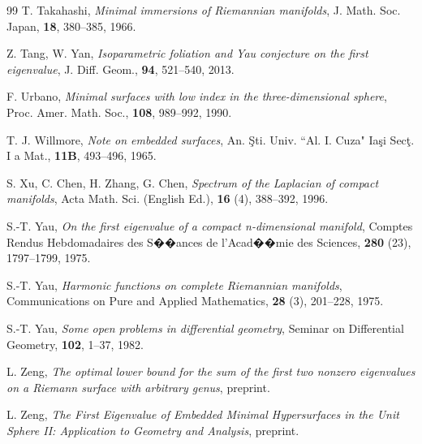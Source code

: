 \documentclass[a4, 12pt]{amsart}
\numberwithin{equation}{section} \numberwithin{equation}{section}
\begin{document}
\begin{thebibliography}{99}
T. Takahashi, \textit{Minimal immersions of Riemannian manifolds}, J. Math. Soc. Japan, {\bf 18}, 380--385, 1966.

Z. Tang, W. Yan, \textit{Isoparametric foliation and Yau conjecture on the first eigenvalue}, J. Diff. Geom., {\bf 94}, 521--540, 2013.

F. Urbano, \textit{Minimal surfaces with low index in the three-dimensional sphere}, Proc. Amer. Math. Soc., {\bf 108}, 989--992, 1990.

T. J. Willmore, \textit{Note on embedded surfaces}, An. \c{S}ti. Univ. ``Al. I. Cuza" Ia\c{s}i Sec\c{t}. I a Mat., {\bf 11B}, 493--496, 1965.

S. Xu, C. Chen, H. Zhang, G. Chen, \textit{Spectrum of the Laplacian of compact manifolds}, Acta Math. Sci. (English Ed.), {\bf 16} (4), 388--392, 1996.

S.-T. Yau, \textit{On the first eigenvalue of a compact n-dimensional manifold}, Comptes Rendus Hebdomadaires des S��ances de l'Acad��mie des Sciences, {\bf 280} (23), 1797--1799, 1975.

S.-T. Yau, \textit{Harmonic functions on complete Riemannian manifolds}, Communications on Pure and Applied Mathematics, {\bf 28} (3), 201--228, 1975.

S.-T. Yau, \textit{Some open problems in differential geometry}, Seminar on Differential Geometry, {\bf 102}, 1--37, 1982.

L. Zeng, \textit{The optimal lower bound for the sum of the first two nonzero eigenvalues on a Riemann surface with arbitrary genus}, preprint.

L. Zeng, \textit{The First Eigenvalue of Embedded Minimal Hypersurfaces in the Unit Sphere II: Application to Geometry and Analysis}, preprint.

\end{thebibliography}
\end{document}
